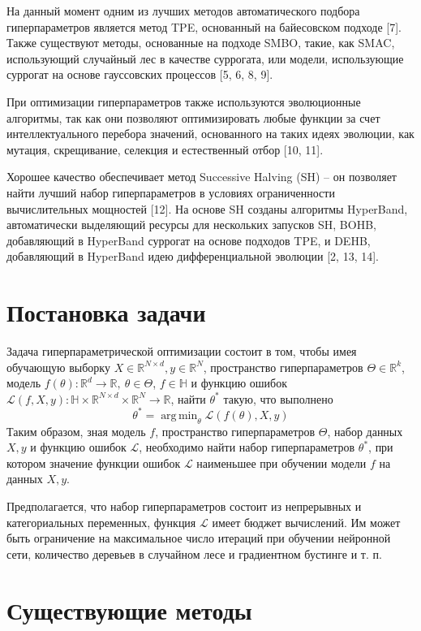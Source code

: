 \documentclass[a4paper,12pt]{article}
\DeclareMathOperator*{\argmin}{arg\,min}
\begin{document}
На данный момент одним из лучших методов автоматического подбора гиперпараметров является метод TPE, основанный на байесовском подходе [7]. Также существуют методы, основанные на подходе SMBO, такие, как SMAC, использующий случайный лес в качестве суррогата, или модели, использующие суррогат на основе гауссовских процессов [5, 6, 8, 9].

При оптимизации гиперпараметров также используются эволюционные алгоритмы, так как они позволяют оптимизировать любые функции за счет интеллектуального перебора значений, основанного на таких идеях эволюции, как мутация, скрещивание, селекция и естественный отбор [10, 11]. 

Хорошее качество обеспечивает метод Successive Halving (SH)  – он позволяет найти лучший набор гиперпараметров в условиях ограниченности вычислительных мощностей [12]. На основе SH созданы алгоритмы HyperBand, автоматически выделяющий ресурсы для нескольких запусков SH, BOHB, добавляющий в HyperBand суррогат на основе подходов TPE, и DEHB, добавляющий в HyperBand идею дифференциальной эволюции [2, 13, 14].

\section{Постановка задачи}
Задача гиперпараметрической оптимизации состоит в том, чтобы имея обучающую выборку $X \in \mathbb{R}^{N\times d}, y \in \mathbb{R}^{N}$, пространство гиперпараметров $\Theta \in \mathbb{R}^k$, модель $f(\theta): \mathbb{R}^{d} \to \mathbb{R},\ \theta \in \Theta$, $f \in \mathbb{H}$ и функцию ошибок $\mathcal{L}(f, X, y): \mathbb{H} \times \mathbb{R}^{N\times d} \times \mathbb{R}^{N} \to \mathbb{R}$, найти $\theta^*$ такую, что выполнено
$$\theta^* = \argmin_{\theta} \mathcal{L}(f(\theta), X, y)$$
Таким образом, зная модель $f$, пространство гиперпараметров $\Theta$, набор данных $X, y$ и функцию ошибок $\mathcal{L}$, необходимо найти набор гиперпараметров $\theta^*$, при котором значение функции ошибок $\mathcal{L}$ наименьшее при обучении модели $f$ на данных $X, y$.

Предполагается, что набор гиперпараметров состоит из непрерывных и категориальных переменных, функция $\mathcal{L}$ имеет бюджет вычислений. Им может быть ограничение на максимальное число итераций при обучении нейронной сети, количество деревьев в случайном лесе и градиентном бустинге и т. п.


\section{Существующие методы}
\end{document}
